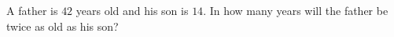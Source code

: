 A father is $42$ years old and his son is $14$. In how many years will the father be twice as old as his son?
